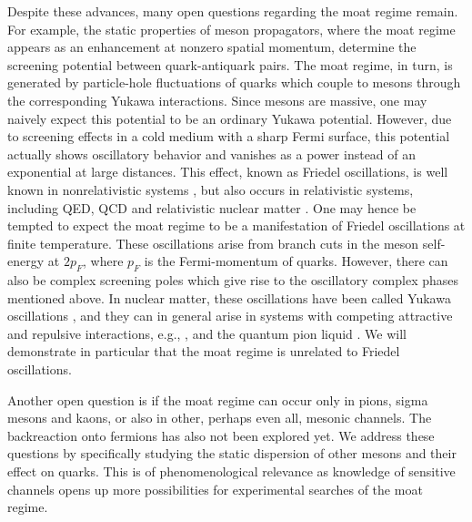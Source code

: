 \documentclass[reprint,english,superscriptaddress,preprintnumbers,amsmath,amssymb,aps,prd]{revtex4-2}
\begin{document}
Despite these advances, many open questions regarding the moat regime remain. For example, the static properties of meson propagators, where the moat regime appears as an enhancement at nonzero spatial momentum, determine the screening potential between quark-antiquark pairs. The moat regime, in turn, is generated by particle-hole fluctuations of quarks which couple to mesons through the corresponding Yukawa interactions. 
Since mesons are massive, one may naively expect this potential to be an ordinary Yukawa potential. However, due to screening effects in a cold medium with a sharp Fermi surface, this potential actually shows oscillatory behavior and vanishes as a power instead of an exponential at large distances. This effect, known as Friedel oscillations, is well known in nonrelativistic systems \cite{fetter2012quantum}, but also occurs in relativistic systems, including QED, QCD and relativistic nuclear matter \cite{Kapusta:1988fi, DiazAlonso:1989up, Diaz-Alonso:1998eva, Liu:2007bu}. One may hence be tempted to expect the moat regime to be a manifestation of Friedel oscillations at finite temperature. These oscillations arise from branch cuts in the meson self-energy at $2 p_F$, where $p_F$ is the Fermi-momentum of quarks. However, there can also be complex screening poles which give rise to the oscillatory complex phases mentioned above. In nuclear matter, these oscillations have been called Yukawa oscillations \cite{DiazAlonso:1989up, Diaz-Alonso:1998eva}, and they can in general arise in systems with competing  attractive and repulsive interactions, e.g., \cite{Chakrabarty_2011, Schindler:2021otf, Haensch:2023sig}, and the quantum pion liquid \cite{Pisarski:2020dnx}. We will demonstrate in particular that the moat regime is unrelated to Friedel oscillations. 

Another open question is if the moat regime can occur only in pions, sigma mesons and kaons, or also in other, perhaps even all, mesonic channels. The backreaction onto fermions has also not been explored yet. We address these questions by specifically studying the static dispersion of other mesons and their effect on quarks. This is of phenomenological relevance as knowledge of sensitive channels opens up more possibilities for experimental searches of the moat regime. 
\end{document}
